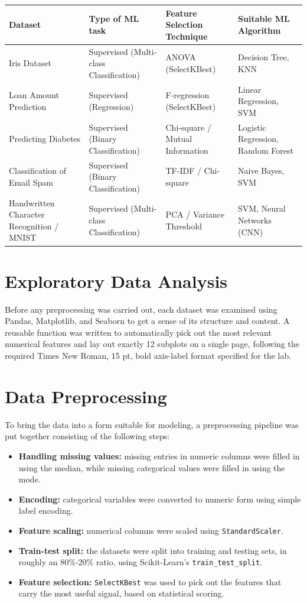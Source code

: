 \documentclass[12pt,a4paper]{article}
\begin{document}
\begin{longtable}{|p{3.5cm}|p{3.5cm}|p{3.5cm}|p{3.5cm}|}
\hline
\textbf{Dataset} & \textbf{Type of ML task} & \textbf{Feature Selection Technique} & \textbf{Suitable ML Algorithm} \\ \hline
\endhead
Iris Dataset & Supervised (Multi-class Classification) & ANOVA (SelectKBest) & Decision Tree, KNN \\ \hline
Loan Amount Prediction & Supervised (Regression) & F-regression (SelectKBest) & Linear Regression, SVM \\ \hline
Predicting Diabetes & Supervised (Binary Classification) & Chi-square / Mutual Information & Logistic Regression, Random Forest \\ \hline
Classification of Email Spam & Supervised (Binary Classification) & TF-IDF / Chi-square & Naive Bayes, SVM \\ \hline
Handwritten Character Recognition / MNIST & Supervised (Multi-class Classification) & PCA / Variance Threshold & SVM, Neural Networks (CNN) \\ \hline
\end{longtable}

\section{Exploratory Data Analysis}
Before any preprocessing was carried out, each dataset was examined using Pandas, Matplotlib, and Seaborn to get a sense of its structure and content. A reusable function was written to automatically pick out the most relevant numerical features and lay out exactly 12 subplots on a single page, following the required Times New Roman, 15 pt, bold axis-label format specified for the lab.

\section{Data Preprocessing}
To bring the data into a form suitable for modeling, a preprocessing pipeline was put together consisting of the following steps:
\begin{itemize}
\item \textbf{Handling missing values:} missing entries in numeric columns were filled in using the median, while missing categorical values were filled in using the mode.
\item \textbf{Encoding:} categorical variables were converted to numeric form using simple label encoding.
\item \textbf{Feature scaling:} numerical columns were scaled using \texttt{StandardScaler}.
\item \textbf{Train-test split:} the datasets were split into training and testing sets, in roughly an 80\%-20\% ratio, using Scikit-Learn's \texttt{train\_test\_split}.
\item \textbf{Feature selection:} \texttt{SelectKBest} was used to pick out the features that carry the most useful signal, based on statistical scoring.
\end{itemize}
\end{document}
